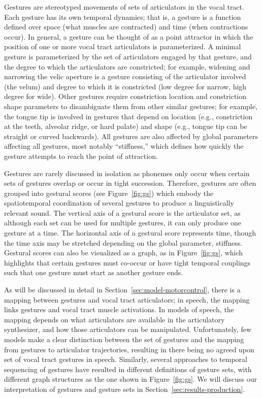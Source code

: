 Gestures are stereotyped movements
of sets of articulators in the vocal tract.
Each gesture has its own temporal dynamics;
that is, a gesture is a function defined
over space (what muscles are contracted)
and time (when contractions occur).
In general, a gesture can be thought of
as a point attractor
in which the position
of one or more vocal tract
articulators is parameterized.
A minimal gesture is parameterized by
the set of articulators engaged
by that gesture,
and the degree to which
the articulators are constricted;
for example,
widening and narrowing the velic aperture
is a gesture consisting of
the articulator involved
(the velum)
and degree to which it is constricted
(low degree for narrow, high degree for wide).
Other gestures require constriction location
and constriction shape parameters
to disambiguate them from other similar gestures;
for example, the tongue tip
is involved in gestures
that depend on location
(e.g., constriction at
the teeth, alveolar ridge, or hard palate)
and shape
(e.g., tongue tip can be straight
or curved backwards).
All gestures are also affected by
global parameters affecting all gestures,
most notably ``stiffness,''
which defines how quickly
the gesture attempts to reach
the point of attraction.

Gestures are rarely discussed in isolation
as phonemes only occur when certain
sets of gestures overlap
or occur in tight succession.
Therefore, gestures are often
grouped into gestural scores
(see Figure~\ref{fig:gs})
which embody the spatiotemporal
coordination of several gestures
to produce a linguistically
relevant sound.
The vertical axis of a gestural score
is the articulator set,
as although each set
can be used for multiple gestures,
it can only produce one gesture
at a time.
The horizontal axis of
a gestural score represents time,
though the time axis may be
stretched depending on
the global parameter, stiffness.
Gestural scores can also
be visualized as a graph,
as in Figure~\ref{fig:gs},
which highlights that
certain gestures must co-occur
or have tight temporal couplings
such that one gesture
must start as another gesture ends.


As will be discussed in detail
in Section~\ref{sec:model-motorcontrol},
there is a mapping
between gestures and vocal tract articulators;
in speech, the mapping links
gestures and vocal tract muscle activations.
In models of speech,
the mapping depends on what articulators
are available in the articulatory synthesizer,
and how those articulators can be manipulated.
Unfortunately, few models make a clear distinction
between the set of gestures
and the mapping from gestures
to articulator trajectories,
resulting in there being
no agreed upon set of vocal tract gestures
in speech.
Similarly, several approaches to
temporal sequencing of gestures
have resulted in different
definitions of gesture sets,
with different graph structures as
the one shown in Figure~\ref{fig:gs}.
We will discuss our interpretation
of gestures and gesture sets
in Section~\ref{sec:results-production}.

